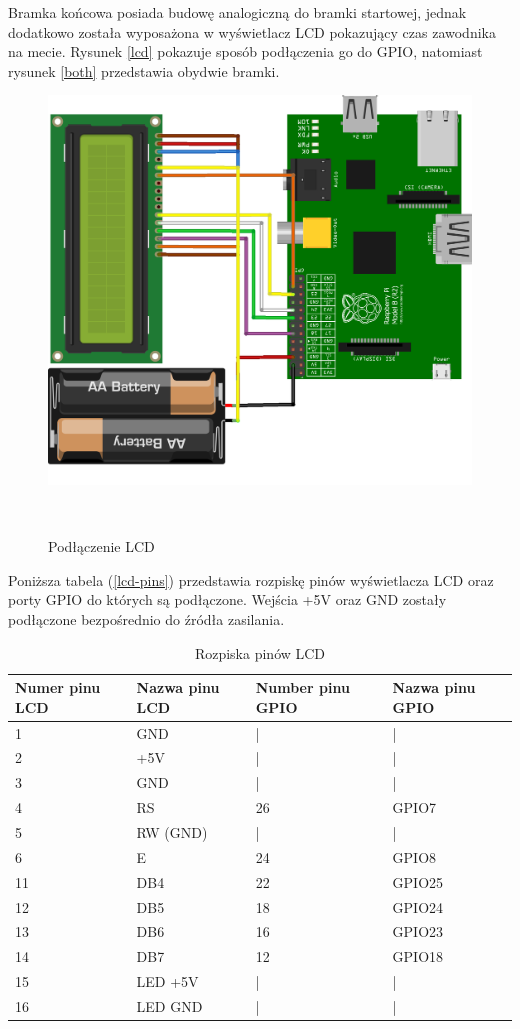 \documentclass[11pt,a4paper, twoside]{article}
\begin{document}
Bramka końcowa posiada budowę analogiczną do bramki startowej, jednak dodatkowo została wyposażona w wyświetlacz LCD pokazujący czas zawodnika na mecie. Rysunek \ref{lcd} pokazuje sposób podłączenia go do GPIO, natomiast rysunek \ref{both} przedstawia obydwie bramki. 
\begin{figure}[H]
\begin{center}
\includegraphics[scale=0.125]{./img/lcd_bb.png}
\caption{Podłączenie LCD}
$\label{lcd}$
\end{center}
\end{figure}
Poniższa tabela (\ref{lcd-pins}) przedstawia rozpiskę pinów wyświetlacza LCD oraz porty GPIO do których są podłączone. Wejścia +5V oraz GND zostały podłączone bezpośrednio do źródła zasilania.
\begin{table}[H]
\begin{center}
\begin{tabular}{ | l | l | l | l | }
\hline
Numer pinu LCD & Nazwa pinu LCD & Number pinu GPIO & Nazwa pinu GPIO \\ \hline
1 & GND & | &  | \\ \hline
2 & +5V & | &  | \\ \hline
3 & GND & | &  | \\ \hline
4 & RS &  26 & GPIO7 \\ \hline
5 & RW (GND) & | & | \\ \hline 
6 & E & 24 & GPIO8 \\ \hline
11 & DB4 & 22 & GPIO25 \\ \hline
12 & DB5 & 18 & GPIO24 \\ \hline
13 & DB6 & 16 & GPIO23 \\ \hline
14 & DB7 & 12 & GPIO18 \\ \hline
15 & LED +5V & | & | \\ \hline
16 & LED GND & | & | \\ \hline
\end{tabular}
\end{center}
\caption{Rozpiska pinów LCD}
$\label{lcd-pins}$
\end{table}
\end{document}
